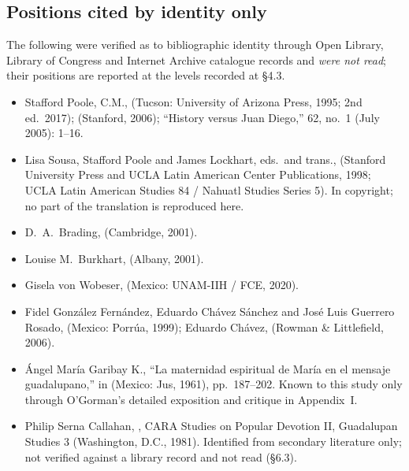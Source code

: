 \subsection*{Positions cited by identity only}

The following were verified as to bibliographic identity through
Open Library, Library of Congress and Internet Archive catalogue
records and \emph{were not read}; their positions are reported at the
levels recorded at \S4.3.

\begin{itemize}
\item Stafford Poole, C.M.,  (Tucson:
University of Arizona Press, 1995; 2nd ed.\ 2017);  (Stanford, 2006); ``History versus
Juan Diego,''  62, no.~1 (July 2005): 1--16.
\item Lisa Sousa, Stafford Poole and James Lockhart, eds.\ and trans.,
 (Stanford University Press and UCLA Latin
American Center Publications, 1998; UCLA Latin American Studies 84 /
Nahuatl Studies Series 5). In copyright; no part of the translation is
reproduced here.
\item D.~A.~Brading,  (Cambridge, 2001).
\item Louise M.~Burkhart,  (Albany, 2001).
\item Gisela von Wobeser,  (Mexico: UNAM-IIH / FCE, 2020).
\item Fidel Gonz\'alez Fern\'andez, Eduardo Ch\'avez S\'anchez and
Jos\'e Luis Guerrero Rosado,  (Mexico: Porr\'ua, 1999); Eduardo Ch\'avez,
 (Rowman \& Littlefield, 2006).
\item \'Angel Mar\'ia Garibay K., ``La maternidad espiritual de
Mar\'ia en el mensaje guadalupano,'' in  (Mexico: Jus, 1961), pp.~187--202. Known to this study only
through O'Gorman's detailed exposition and critique in Appendix~I.
\item Philip Serna Callahan, , CARA Studies on Popular Devotion II, Guadalupan Studies 3
(Washington, D.C., 1981). Identified from secondary literature only;
not verified against a library record and not read (\S6.3).
\end{itemize}

